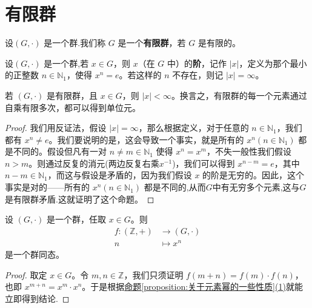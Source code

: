 \documentclass[../../main.tex]{subfiles}
\begin{document}
\section{有限群}

\begin{definition}[有限群]
设$(G,\cdot)$ 是一个群.我们称 $G$ 是一个\textbf{有限群}，若 $G$ 是有限的。 
\end{definition}

\begin{definition}[元素的阶]
设$(G,\cdot)$ 是一个群,若 $x\in G$，则 $x$（在 $G$ 中）的\textbf{阶}，记作 $|x|$，定义为那个最小的正整数 $n\in\mathbb{N}_1$，使得 $x^n = e$。若这样的 $n$ 不存在，则记 $|x|=\infty$。 
\end{definition}

\begin{proposition}[有限群的每个元素的阶必有限]\label{proposition:有限群的每个元素的阶必有限}
若 $(G,\cdot)$ 是有限群，且 $x\in G$，则 $|x|<\infty$。换言之，有限群的每一个元素通过自乘有限多次，都可以得到单位元。
\end{proposition}
\begin{proof}
我们用反证法，假设 $|x|=\infty$，那么根据定义，对于任意的 $n\in\mathbb{N}_1$，我们都有 $x^n\neq e$。我们要说明的是，这会导致一个事实，就是所有的 $x^n(n\in\mathbb{N}_1)$ 都是不同的。假设但凡有一对 $n\neq m\in\mathbb{N}_1$ 使得 $x^n = x^m$，不失一般性我们假设 $n>m$。则通过反复的消元(两边反复右乘$x^{-1}$)，我们可以得到 $x^{n - m}=e$，其中 $n - m\in\mathbb{N}_1$，而这与假设是矛盾的，因为我们假设 $x$ 的阶是无穷的。因此，这个事实是对的——所有的 $x^n(n\in\mathbb{N}_1)$ 都是不同的,从而$G$中有无穷多个元素,这与$G$是有限群矛盾.这就证明了这个命题。 

\end{proof}

\begin{proposition}\label{proposition:关于幂的群同态}
设 $(G,\cdot)$ 是一个群，任取 $x\in G$。则
\begin{align*}
f:(\mathbb{Z} ,+)&\rightarrow (G,\cdot )
\\
n&\mapsto x^n
\end{align*}
是一个群同态。
\end{proposition}
\begin{proof}
取定 $x\in G$。令 $m,n\in\mathbb{Z}$，我们只须证明 $f(m + n)=f(m)\cdot f(n)$，也即 $x^{m + n}=x^m\cdot x^n$。于是根据\hyperref[proposition:关于元素幂的一些性质]{命题\ref{proposition:关于元素幂的一些性质}(1)}就能立即得到结论.

\end{proof}
\end{document}

